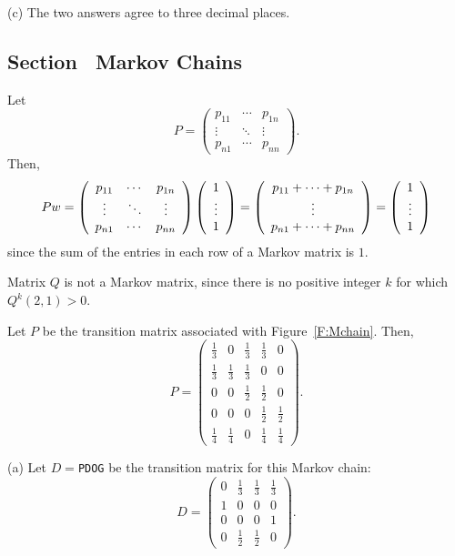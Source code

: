 \documentclass{ximera}
\begin{document}
(c)  The two answers agree to three decimal places.

\begin{figure}[htb]
                       \centerline{%
                       }
\end{figure}



\subsection*{Section~\protect{\ref{S:TransitionApplied}} Markov Chains}

Let
\[ P = \left(\begin{array}{ccc} p_{11} & \cdots & p_{1n} \\
\vdots & \ddots & \vdots \\ p_{n1} & \cdots & p_{nn}
\end{array}\right). \]
Then,
\[ Pw = \left(\begin{array}{ccc} p_{11} & \cdots & p_{1n} \\
\vdots & \ddots & \vdots \\ p_{n1} & \cdots & p_{nn}
\end{array}\right) \left(\begin{array}{c} 1 \\ \vdots \\ 1\end{array}\right) = 
\left(\begin{array}{c} p_{11} + \cdots + p_{1n} \\ \vdots \\ p_{n1} + \cdots +
p_{nn}\end{array}\right) = \left(\begin{array}{c} 1 \\ \vdots \\ 1\end{array}\right) \]
since the sum of the entries in each row of a Markov matrix is $1$.

 Matrix $Q$ is not a Markov matrix, since there is no
positive integer $k$ for which $Q^k(2,1) > 0$.

Let $P$ be the transition matrix associated with Figure~\ref{F:Mchain}.
Then,
\[ P = \left(\begin{array}{rrrrr}
\frac{1}{3} & 0 & \frac{1}{3} & \frac{1}{3} & 0 \\
\frac{1}{3} & \frac{1}{3} & \frac{1}{3} & 0 & 0 \\
0 & 0 & \frac{1}{2} & \frac{1}{2} & 0 \\
0 & 0 & 0 & \frac{1}{2} & \frac{1}{2} \\
\frac{1}{4} & \frac{1}{4} & 0 & \frac{1}{4} & \frac{1}{4}
\end{array}\right). \]

(a) \ans Let $D =${\tt PDOG} be the transition matrix for this Markov chain:
\[
D = \left(\begin{array}{rrrr} 0 & \frac{1}{3} & \frac{1}{3} &
\frac{1}{3} \\ 1 & 0 & 0 & 0 \\ 0 & 0 & 0 & 1 \\
0 & \frac{1}{2} & \frac{1}{2} & 0 \end{array}\right).
\]
\end{document}
